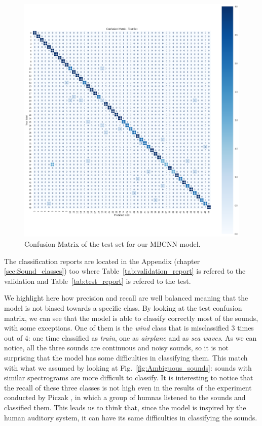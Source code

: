 \documentclass{article}
\begin{document}
\begin{sloppy}
\begin{figure}[ht]
  \centering
  \centerline{\includegraphics[width=\columnwidth]{Confusion_matrix_test.png}}
  \caption{Confusion Matrix of the test set for our MBCNN model.}
  \label{fig:confusion_matrix_test}
\end{figure}


The classification reports are located in the Appendix (chapter \ref{sec:Sound_classes}) too where Table~\ref{tab:validation_report}
is refered to the validation and Table~\ref{tab:test_report} is refered to the test.

We highlight here how precision and recall are well balanced meaning that the model is not biased towards a specific class.
\newline
By looking at the test confusion matrix, we can see that the model is able to classify correctly most of the sounds, with some exceptions.
One of them is the \textit{wind} class that is misclassified 3 times out of 4: one time classified as
\textit{train}, one as \textit{airplane} and as \textit{sea waves}. As we can notice, all the three sounds
are continuous and noisy sounds, so it is not surprising that the model has some difficulties in classifying them.
This match with what we assumed by looking at Fig.~\ref{fig:Ambiguous_sounds}: sounds with similar spectrograms are
more difficult to classify. It is interesting to notice that the recall of these three classes is not high even in the 
results of the experiment conducted by Piczak \cite{piczak2015dataset}, in which a group of humnas listened to the sounds and classified them.
This leads us to think that, since the model is inspired by the human auditory system, it can have its same difficulties in classifying the sounds. 


\end{sloppy}
\end{document}
